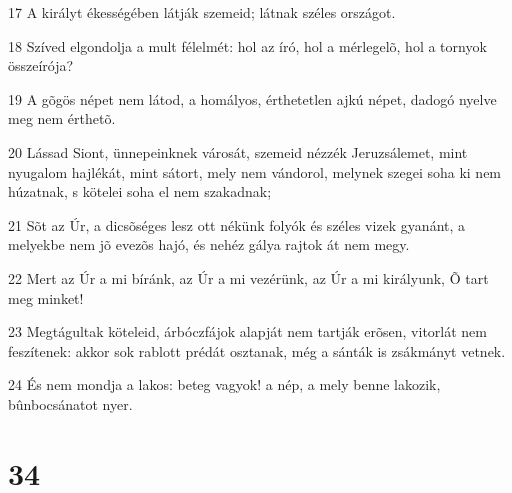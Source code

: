 \par 17 A királyt ékességében látják szemeid; látnak széles országot.
\par 18 Szíved elgondolja a mult félelmét: hol az író, hol a mérlegelõ, hol a tornyok összeírója?
\par 19 A gõgös népet nem látod, a homályos, érthetetlen ajkú népet, dadogó nyelve meg nem érthetõ.
\par 20 Lássad Siont, ünnepeinknek városát, szemeid nézzék Jeruzsálemet, mint nyugalom hajlékát, mint sátort, mely nem vándorol, melynek szegei soha ki nem húzatnak, s kötelei soha el nem szakadnak;
\par 21 Sõt az Úr, a dicsõséges lesz ott nékünk folyók és széles vizek gyanánt, a melyekbe nem jõ evezõs hajó, és nehéz gálya rajtok át nem megy.
\par 22 Mert az Úr a mi bíránk, az Úr a mi vezérünk, az Úr a mi királyunk, Õ tart meg minket!
\par 23 Megtágultak köteleid, árbóczfájok alapját nem tartják erõsen, vitorlát nem feszítenek: akkor sok rablott prédát osztanak, még a sánták is zsákmányt vetnek.
\par 24 És nem mondja a lakos: beteg vagyok! a nép, a mely benne lakozik, bûnbocsánatot nyer.

\chapter{34}

